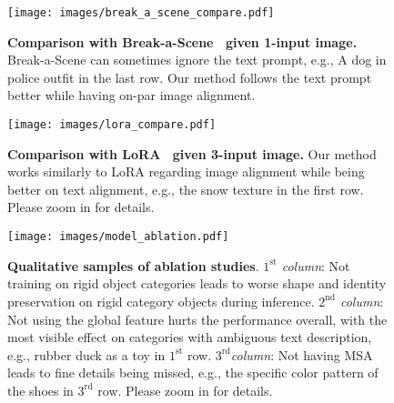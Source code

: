\begin{figure}[t]
    \centering
    \texttt{[image: images/break\_a\_scene\_compare.pdf]}
    \vspace{-20pt}
    \caption{{\textbf{Comparison with Break-a-Scene~\cite{avrahami2023break} given 1-input image.} Break-a-Scene can sometimes ignore the text prompt, e.g., {\menlo A dog in police outfit } in the last row. Our method follows the text prompt better while having on-par image alignment.
    }}
\end{figure}

\begin{figure}[t]
    \centering
    \texttt{[image: images/lora\_compare.pdf]}
    \vspace{-20pt}
    \caption{{\textbf{Comparison with LoRA~\cite{loraimplementation} given 3-input image.} Our method works similarly to LoRA regarding image alignment while being better on text alignment, e.g., the snow texture in the first row. Please zoom in for details.
    }}
\end{figure}

\begin{figure}[t]
    \centering
    \texttt{[image: images/model\_ablation.pdf]}
    \vspace{-20pt}
    \caption{\textbf{Qualitative samples of ablation studies}. \textit{$1^{\text{st}}$ column}: Not training on rigid object categories leads to worse shape and identity preservation on rigid category objects during inference. \textit{$2^{\text{nd}}$ column}: Not using the global feature hurts the performance overall, with the most visible effect on categories with ambiguous text description, e.g., rubber duck as a toy in $1^{\text{st}}$ row. \textit{ $3^{\text{rd}}$column}: Not having MSA leads to fine details being missed, e.g., the specific color pattern of the shoes in $3^{\text{rd}}$ row. Please zoom in for details.
    }
    \vspace{-10pt}
\end{figure}

